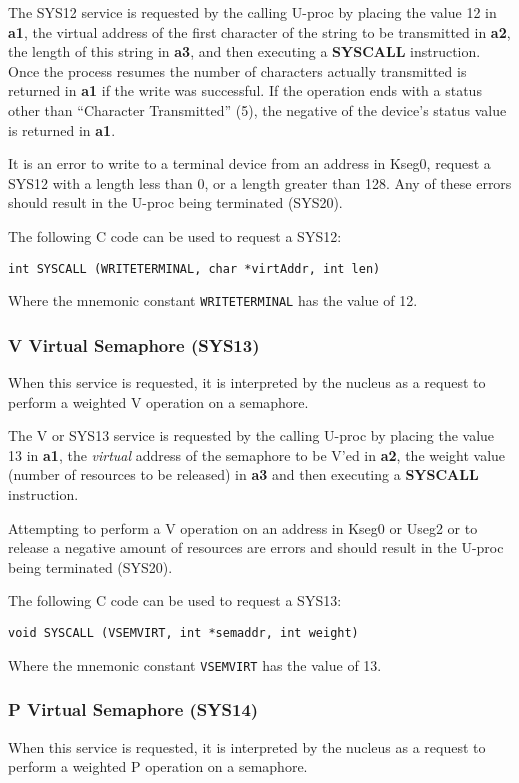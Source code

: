 The SYS12 service is requested by the calling U-proc by placing the value 12 in \textbf{a1}, the virtual address of the first character of the string to be transmitted in \textbf{a2}, the length of this string in \textbf{a3}, and then executing a \textbf{SYSCALL} instruction. 
Once the process resumes the number of characters actually transmitted is returned in \textbf{a1} if the write was successful. 
If the operation ends with a status other than ``Character Transmitted'' (5), the negative of the device's status value is returned in \textbf{a1}.

It is an error to write to a terminal device from an address in Kseg0, request a SYS12 with a length less than 0, or a length greater than 128. Any of these errors should result in the U-proc being terminated (SYS20).

The following C code can be used to request a SYS12:
\begin{center}
\verb+int SYSCALL (WRITETERMINAL, char *virtAddr, int len)+
\end{center}
Where the mnemonic constant \verb+WRITETERMINAL+ has the value of 12.


\subsubsection{V Virtual Semaphore (SYS13)}
When this service is requested, it is interpreted by the nucleus as a request to perform a weighted V operation on a semaphore.

The V or SYS13 service is requested by the calling U-proc by placing the value 13 in \textbf{a1}, the \emph{virtual} address of the semaphore to be V'ed in \textbf{a2}, the weight value (number of resources to be released) in \textbf{a3} and then executing a \textbf{SYSCALL} instruction.

Attempting to perform a V operation on an address in Kseg0 or Useg2 or to release a negative amount of resources are errors and should result in the U-proc being terminated (SYS20).

The following C code can be used to request a SYS13:
\begin{center}
\verb+void SYSCALL (VSEMVIRT, int *semaddr, int weight)+
\end{center}
Where the mnemonic constant \verb+VSEMVIRT+ has the value of 13.


\subsubsection{P Virtual Semaphore (SYS14)}
When this service is requested, it is interpreted by the nucleus as a request to perform a weighted P operation on a semaphore.

